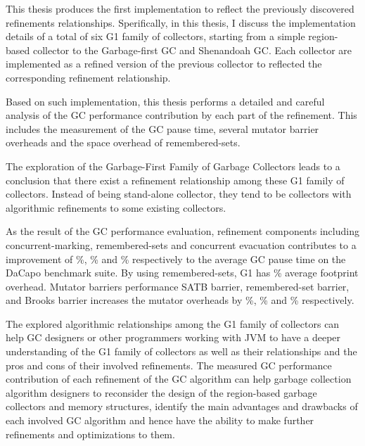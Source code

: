 This thesis produces the first implementation to reflect the previously
discovered refinements relationships.
Sperifically, in this thesis, I discuss the implementation details of a total of six G1 family
of collectors, starting from a simple region-based
collector to the Garbage-first GC and Shenandoah GC.
Each collector are implemented as a refined version of the previous collector to reflected
the corresponding refinement relationship.

Based on such implementation, this thesis performs a detailed
and careful analysis of the GC performance contribution by each part of the refinement.
This includes the measurement of the GC pause time, several mutator barrier overheads
and the space overhead of remembered-sets.


The exploration of the Garbage-First Family of Garbage Collectors leads to a conclusion
that there exist a refinement relationship among these G1 family of collectors.
Instead of being stand-alone collector, they tend to be collectors with
algorithmic refinements to some existing collectors.

As the result of the GC performance evaluation,
refinement components including concurrent-marking, remembered-sets and concurrent
evacuation contributes to a improvement of \%, \% and \%
respectively to the average GC pause time on the DaCapo benchmark suite.
By using remembered-sets, G1 has \% average footprint overhead.
Mutator barriers performance SATB barrier, remembered-set barrier,
and Brooks barrier increases the mutator overheads by \%, \%
and  \%
respectively.


The explored algorithmic relationships among the G1 family of collectors can help
GC designers or other programmers working with JVM to have a deeper understanding of
the G1 family of collectors as well as their relationships and the pros and cons of their involved refinements.
The measured GC performance contribution of each refinement of the GC algorithm
can help garbage collection algorithm designers to reconsider the design of 
the region-based garbage collectors and memory structures, identify
the main advantages and drawbacks of each involved GC algorithm and
hence have the ability to make further refinements and optimizations to them.

